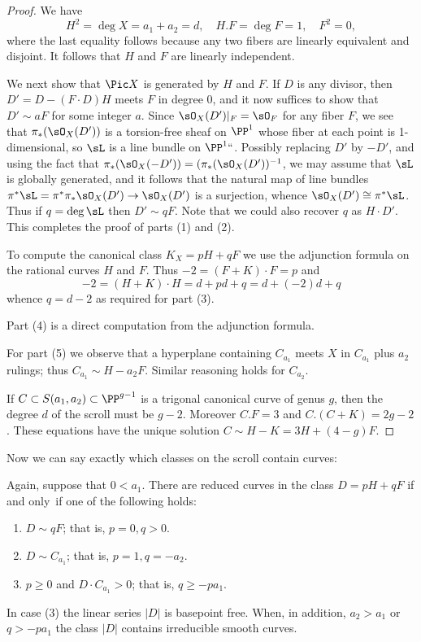 \begin{proof}
We have
$$
H^2 = \deg X = a_1+a_2 = d, \quad H.F = \deg F = 1, \quad F^2 = 0,
$$
where the last equality follows because any two fibers are linearly
equivalent and disjoint.
It follows 
that $H$ and $F$ are linearly independent.

We next show that $\Pic X$ is generated by $H$ and $F$. If $D$ is any
divisor,
then $D' = D - (F\cdot D)H$ meets $F$ in degree 0, and it now suffices
to show that $D'\sim aF$ for
some integer $a$.
Since $\sO_X(D')|_F = \sO_F$ for any fiber $F$, we see that
$\pi_*(\sO_X(D'))$ is a torsion-free sheaf on $\PP^1$ whose fiber at
each point is 1-dimensional,
so $\sL$ is a line bundle on $\PP^1` `$.  Possibly replacing $D'$ by
$-D'$, and using the fact that
$\pi_*(\sO_X(-D')) = (\pi_*(\sO_X(D'))^{-1}$, we may assume that $\sL$ is
globally generated, and it follows that  the natural map of line bundles
$\pi^*\sL = \pi^*\pi_* \sO_X(D') \to \sO_X(D') $ is a surjection, whence
$\sO_X(D') \cong \pi^*\sL$. Thus if $q = \deg \sL$ then
$D' \sim qF$. Note that we could also recover $q$ as $H\cdot D'$. This
completes the proof of parts
(1) and (2).

To compute the canonical class $K_X = pH+qF$ we use the adjunction
formula on the rational curves
$H$ and $F$. Thus $-2 = (F+K)\cdot F = p $ and
$$
-2 = (H+K)\cdot H = d + pd+q = d + (-2)d+q
$$
whence $q = d-2$ as required for part (3).

Part (4) is a direct computation from the adjunction formula.

For part (5) we observe that a hyperplane containing $C_{a_1}$ meets $X$
in $C_{a_1}$ plus
$a_2$ rulings; thus $C_{a_1}\sim H-a_2F$. Similar reasoning holds for
$C_{a_{2}}$.

If  $C \subset S(a_{1}, a_{2}) \subset \PP^{g-1}$ is a	trigonal canonical
curve of genus $g$, then the degree
$d$ of the scroll must be $g-2$. Moreover $C.F=3$ and $C.(C+K) =
2g-2$. These equations have the unique solution
$C \sim H-K = 3H + (4-g)F$.
\end{proof}

Now we can say exactly which classes on the scroll contain curves:

\begin{theorem}\label{where are the curves?} Again, suppose that
$0<a_{1}$.
There are reduced  curves in the class $D = pH+qF$ if and only~if one
of the following holds:

\begin{enumerate}
\item $D\sim qF$; that is, $p=0, q>0$.
\item $D\sim C_{a_{1}}$; that is, $p=1, q=-a_{2}$.
\item $p\geq 0$ and $D\cdot C_{a_{1}}> 0$; that is, $q \geq -pa_1$.
\end{enumerate}
In case (3) the linear series $|D|$ is 
basepoint free. 
%
When, in addition,
$a_2>a_1$ or $q>-pa_1$ the class $|D|$ contains irreducible smooth curves.
\unif
\end{theorem}

